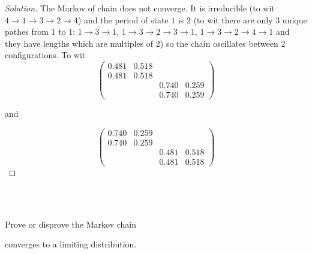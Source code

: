 \documentclass[12pt]{article}
\newenvironment{problem}[2][Problem]{\begin{trivlist}
\item[\hskip \labelsep {\bfseries #1}\hskip \labelsep {\bfseries #2.}]}{\end{trivlist}}
\newenvironment{solution}
  {\begin{proof}[Solution]\renewcommand{\qedsymbol}{}}
  {\end{proof}}
\begin{document}
\begin{solution}

The Markov of chain does not converge. It is irreducible (to wit $4 \rightarrow 1 \rightarrow 3 \rightarrow 2 \rightarrow 4$) and the period of state $1$ is 2 (to wit there are only 3 unique pathes from $1$ to $1$: $1\rightarrow 3 \rightarrow 1$, $1\rightarrow 3\rightarrow 2\rightarrow 3 \rightarrow 1$, $1\rightarrow 3 \rightarrow 2 \rightarrow 4\rightarrow 1$ and they have lengths which are multiples of 2) so the chain oscillates between 2 configurations. To wit 
$$\begin{pmatrix}
0.481 & 0.518 & & \\
0.481 & 0.518 & & \\
& & 0.740 & 0.259 \\
& & 0.740 & 0.259 
\end{pmatrix}
$$

\begin{center}and\end{center}

$$\begin{pmatrix}
 0.740 & 0.259& & \\
 0.740 & 0.259& & \\
& &0.481 & 0.518 \\
& &0.481 & 0.518 
\end{pmatrix}
$$



\end{solution}

\ \\ \\

\begin{problem}{1b} %
Prove or disprove the Markov chain


\begin{center}
\end{center}
converges to a limiting distribution.

\end{problem}
 
\end{document}
